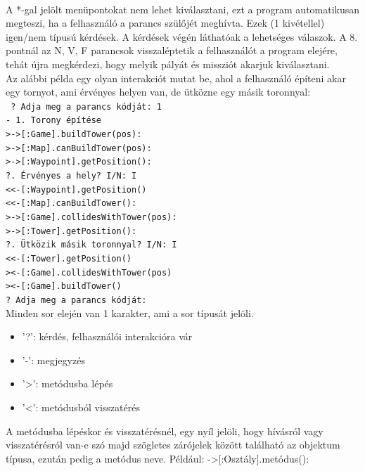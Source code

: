 \endgroup \\
A *-gal jelölt menüpontokat nem lehet kiválasztani, ezt a program automatikusan megteszi, ha a felhasználó a parancs szülőjét meghívta. Ezek (1 kivétellel) igen/nem típusú kérdések. A kérdések végén láthatóak a lehetséges válaszok. A 8. pontnál  az N, V, F parancsok visszaléptetik a felhasználót a program elejére, tehát újra megkérdezi, hogy melyik pályát és missziót akarjuk kiválasztani.
\\
Az alábbi példa egy olyan interakciót mutat be, ahol a felhasználó építeni akar egy tornyot, ami érvényes helyen van, de ütközne egy másik toronnyal: \\
\begingroup
\fontsize{10pt}{10pt}\selectfont
\texttt{
? Adja meg a parancs kódját: 1 \\
- 1. Torony építése \\
>\indent ->[:Game].buildTower(pos): \\
>\indent \indent ->[:Map].canBuildTower(pos): \\
>\indent \indent \indent ->[:Waypoint].getPosition(): \\
?\indent \indent {}. Érvényes a hely? I/N: I \\
<\indent \indent \indent <-[:Waypoint].getPosition() \\
<\indent \indent <-[:Map].canBuildTower(): \\
>\indent \indent ->[:Game].collidesWithTower(pos): \\
>\indent \indent \indent ->[:Tower].getPosition(): \\
?\indent \indent {}. Ütközik másik toronnyal? I/N: I \\
<\indent \indent \indent <-[:Tower].getPosition() \\
>\indent \indent <-[:Game].collidesWithTower(pos) \\
>\indent <-[:Game].buildTower() \\
? Adja meg a parancs kódját:
} \\
\endgroup
\pagebreak
Minden sor elején van 1 karakter, ami a sor típusát jelöli.
\begin{itemize}
\item '?': kérdés, felhasználói interakcióra vár
\item '-': megjegyzés
\item '>': metódusba lépés
\item '<': metódusból visszatérés
\end{itemize}
A metódusba lépéskor és visszatérésnél, egy nyíl jelöli, hogy hívásról vagy visszatérésról van-e szó majd szögletes zárójelek között található az objektum típusa, ezután pedig a metódus neve. Például: ->[:Osztály].metódus():

